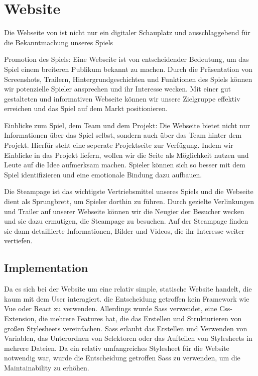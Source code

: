 
\section{Website}\label{sec:website}

\renewcommand{\kapitelautor}{Autor: Nils Hubmann \& Marvin Kurka} %

%
Die Webseite von \ff ist nicht nur ein digitaler Schauplatz und ausschlaggebend für die Bekanntmachung unseres Spiels

Promotion des Spiels:
Eine Webseite ist von entscheidender Bedeutung, um das Spiel einem breiteren Publikum bekannt zu machen. Durch die Präsentation von Screenshots, Trailern,
Hintergrundgeschichten und Funktionen des Spiels können wir potenzielle Spieler ansprechen und ihr Interesse wecken. Mit einer gut gestalteten und informativen Webseite
können wir unsere Zielgruppe effektiv erreichen und das Spiel auf dem Markt positionieren.


Einblicke zum Spiel, dem Team und dem Projekt:
Die Webseite bietet nicht nur Informationen über das Spiel selbst, sondern auch über das Team hinter dem Projekt. Hierfür steht eine seperate Projektseite zur Verfügung.
Indem wir Einblicke in das Projekt liefern, wollen wir die Seite als Möglichkeit nutzen und Leute auf die Idee aufmerksam machen.
Spieler können sich so besser mit dem Spiel identifizieren und eine emotionale Bindung dazu aufbauen.

Die Steampage ist das wichtigste Vertriebsmittel unseres Spiels und die Webseite dient als Sprungbrett, um Spieler dorthin zu führen. Durch gezielte Verlinkungen und Trailer auf unserer Webseite
können wir die Neugier der Besucher wecken und sie dazu ermutigen, die Steampage zu besuchen. Auf der Steampage finden sie dann detaillierte Informationen, Bilder und Videos, die ihr Interesse weiter vertiefen.
%

\subsection{Implementation}
\renewcommand{\kapitelautor}{Autor: Marvin Kurka}

Da es sich bei der Website um eine relativ simple, statische Website handelt, die kaum mit dem User interagiert.
die Entscheidung getroffen kein Framework wie \zB Vue oder React zu verwenden.
Allerdings wurde Sass verwendet, eine Css-Extension, die mehrere Features hat, die das Erstellen und Strukturieren
von großen Stylesheets vereinfachen.
Sass erlaubt \zB das Erstellen und Verwenden von Variablen, das Unterordnen von Selektoren oder das Aufteilen von
Stylesheets in mehrere Dateien.\cite{sassDoc}
Da ein relativ umfangreiches Stylesheet für die Website notwendig war, wurde die Entscheidung getroffen Sass zu
verwenden, um die Maintainability zu erhöhen.

